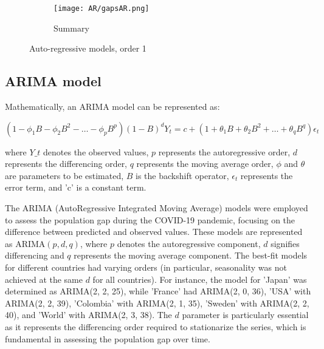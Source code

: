 \documentclass[hidelinks,11pts]{article}
\DeclareMathOperator{\1}{\mathbbm{1}}
\begin{document}
\begin{figure}
    \centering
    \begin{subfigure}{0.45\textwidth}
    \texttt{[image: AR/gapsAR.png]}
    \caption*{Summary}
    \end{subfigure}
    \caption{Auto-regressive models, order 1}
    \label{fig:AR}
\end{figure}



\subsection{ARIMA model }
Mathematically, an ARIMA model can be represented as: 

  \begin{equation*}
(1 - \phi_1 B - \phi_2 B^2 - \ldots - \phi_p B^p)(1 - B)^d Y_t = c + (1 + \theta_1 B + \theta_2 B^2 + \ldots + \theta_q B^q) \epsilon_t
  \end{equation*}
  
where $Y\_t$ denotes the observed values, $p$ represents the autoregressive order, $d$ represents the differencing order, $q$ represents the moving average order, $\phi$ and $\theta$ are parameters to be estimated, $B$ is the backshift operator, $\epsilon_t$ represents the error term, and 'c' is a constant term.

The ARIMA (AutoRegressive Integrated Moving Average) models were employed to assess the population gap during the COVID-19 pandemic, focusing on the difference between predicted and observed values. These models are represented as ARIMA$(p, d, q)$, where $p$ denotes the autoregressive component, $d$ signifies differencing and $q$ represents the moving average component. The best-fit models for different countries had varying orders (in particular, seasonality was not achieved at the same $d$ for all countries). For instance, the model for 'Japan' was determined as ARIMA(2, 2, 25), while 'France' had ARIMA(2, 0, 36), 'USA' with ARIMA(2, 2, 39), 'Colombia' with ARIMA(2, 1, 35), 'Sweden' with ARIMA(2, 2, 40), and 'World' with ARIMA(2, 3, 38). The $d$ parameter is particularly essential as it represents the differencing order required to stationarize the series, which is fundamental in assessing the population gap over time. 
\end{document}
